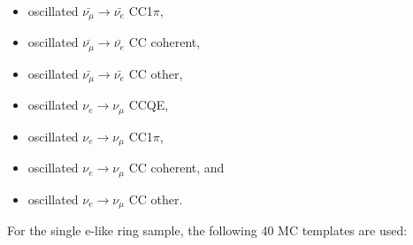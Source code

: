 \begin{itemize}
\item  oscillated $\bar{\nu_{\mu}} \rightarrow \bar{\nu_{e}}$ CC1$\pi$,
\item  oscillated $\bar{\nu_{\mu}} \rightarrow \bar{\nu_{e}}$ CC coherent,
\item  oscillated $\bar{\nu_{\mu}} \rightarrow \bar{\nu_{e}}$ CC other,
\item  oscillated $\nu_{e} \rightarrow \nu_{\mu}$ CCQE,
\item  oscillated $\nu_{e} \rightarrow \nu_{\mu}$ CC1$\pi$,
\item  oscillated $\nu_{e} \rightarrow \nu_{\mu}$ CC coherent, and
\item  oscillated $\nu_{e} \rightarrow \nu_{\mu}$ CC other.
\end{itemize}


For the single e-like ring sample, the following 40 MC templates are used:

